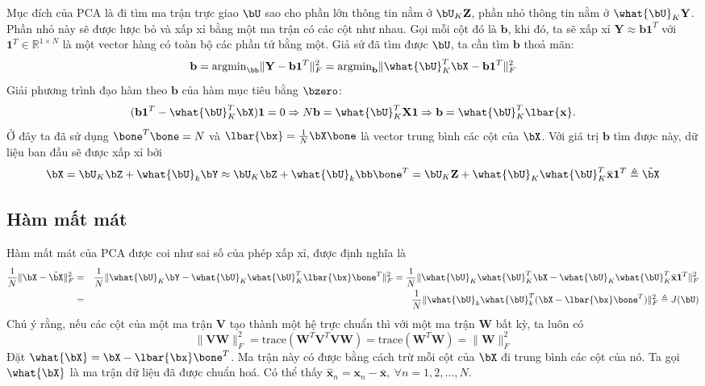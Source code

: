 Mục đích của PCA là đi tìm ma trận trực giao $\bU$ sao cho phần lớn thông tin
nằm ở $\bU_K \mathbf{Z}$, phần nhỏ thông tin nằm ở $\what{\bU}_K\mathbf{Y}$.
Phần nhỏ này sẽ được lược bỏ và xấp xỉ bằng một ma trận có các
cột như nhau. Gọi mỗi cột đó là
$\mathbf{b}$, khi đó, ta sẽ xấp xỉ $\mathbf{Y} \approx
\mathbf{b1}^T$ với $\mathbf{1}^T\in \mathbb{R}^{1
\times N}$ là một vector hàng có toàn
bộ các phần tử bằng một. Giả sử đã tìm được $\bU$, ta cần tìm $\mathbf{b}$ thoả mãn:
\begin{equation} 
    \mathbf{b} = \text{argmin}_{\bb} \|\mathbf{Y} - \mathbf{b1}^T\|_F^2 =
    \text{argmin}_{\mathbf{b}} \|\what{\bU}_K^T\bX - \mathbf{b1}^T\|_F^2 
\end{equation} 
Giải phương trình đạo hàm theo $\mathbf{b}$ của hàm mục tiêu bằng $\bzero$: 
\begin{equation} 
    (\mathbf{b1}^T - \what{\bU}_K^T\bX)\mathbf{1} = 0 \Rightarrow N\mathbf{b} = \what{\bU}_K^T \mathbf{X1} \Rightarrow \mathbf{b} = \what{\bU}_K^T \lbar{\mathbf{x}}.
\end{equation} 
Ở đây ta đã sử dụng $\bone^T\bone = N$ và $\lbar{\bx} = \frac{1}{N}\bX\bone$ là
vector trung bình các cột của $\bX$. 
Với giá trị $\mathbf{b}$ tìm được này, dữ liệu ban đầu sẽ được xấp xỉ bởi
\begin{equation} 
\label{eqn:27_10}
\bX = \bU_K \bZ + \what{\bU}_k\bY \approx \bU_K\bZ + \what{\bU}_k \bb\bone^T
= \bU_K \mathbf{Z} + \what{\bU}_K \what{\bU}_K^T\bar{\mathbf{x}}\mathbf{1}^T
\triangleq \tilde{\bX}
\end{equation} 
\subsection{Hàm mất mát}
Hàm mất mát của PCA được coi như sai số của phép xấp xỉ, được định
nghĩa là 
\begin{eqnarray}
\nonumber
\frac{1}{N}\|\bX - \tilde{\bX}\|_F^2 &=& 
\frac{1}{N}\|\what{\bU}_K \bY-  \what{\bU}_K
\what{\bU}_K^T\lbar{\bx}\bone^T\|_F^2 = 
\frac{1}{N}\|\what{\bU}_K \what{\bU}_K^T \bX -  \what{\bU}_K
\what{\bU}_K^T \bar{\mathbf{x}}\mathbf{1}^T\|_F^2\\
\label{eqn:27_11}
&=& \frac{1}{N} \|\what{\bU}_k \what{\bU}_k^T(\bX - \lbar{\bx}\bone^T)\|_F^2
\triangleq J(\bU)
\end{eqnarray}
Chú ý rằng, nếu các cột của một ma trận $\mathbf{V}$ tạo thành một hệ
trực chuẩn thì với một ma trận $\mathbf{W}$ bất kỳ, ta luôn có
\begin{equation} 
    \|\mathbf{VW}\|_F^2 = \text{trace} (\mathbf{W}^T\mathbf{V}^T\mathbf{V} \mathbf{W}) = \text{trace}(\mathbf{W}^T\mathbf{W}) = \|\mathbf{W}\|_F^2 
\end{equation} 
Đặt $\what{\bX} = \bX - \lbar{\bx}\bone^T$. Ma trận này có được bằng cách trừ
mỗi cột của $\bX$ đi trung bình các cột của nó. Ta gọi $\what{\bX}$ là {ma trận dữ liệu đã
được chuẩn hoá}. Có thể thấy $\hat{\mathbf{x}}_n = \mathbf{x}_n -
\bar{\mathbf{x}},~\forall n = 1, 2, \dots, N$.

